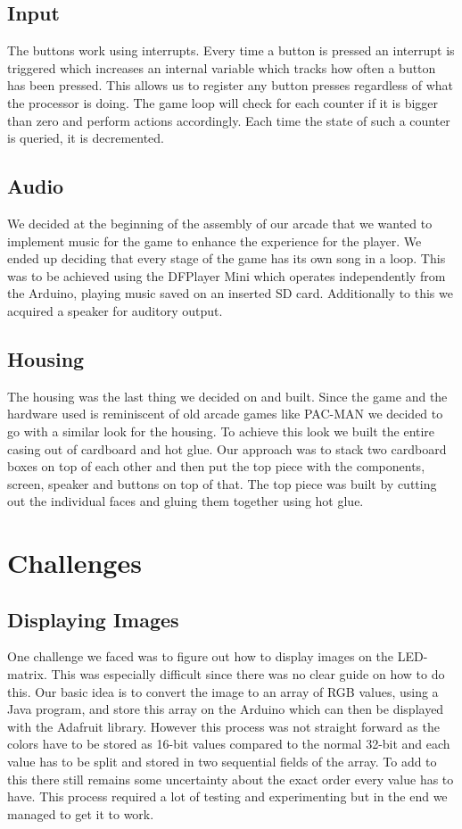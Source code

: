 \documentclass[10pt, a4paper]{article}
\begin{document}
\subsection*{Input}
The buttons work using interrupts. Every time a button is pressed an interrupt is triggered which increases an internal variable which tracks how often a button has been pressed. This allows us to register any button presses regardless of what the processor is doing. The game loop will check for each counter if it is bigger than zero and perform actions accordingly. Each time the state of such a counter is queried, it is decremented.

\subsection*{Audio}
We decided at the beginning of the assembly of our arcade that we wanted to implement music for the game to enhance the experience for the player. We ended up deciding that every stage of the game has its own song in a loop. This was to be achieved using the DFPlayer Mini which operates independently from the Arduino, playing music saved on an inserted SD card. Additionally to this we acquired a speaker for auditory output.

\subsection*{Housing}
The housing was the last thing we decided on and built. Since the game and the hardware used is reminiscent of old arcade games like PAC-MAN we decided to go with a similar look for the housing. To achieve this look we built the entire casing out of cardboard and hot glue. Our approach was to stack two cardboard boxes on top of each other and then put the top piece with the components, screen, speaker and buttons on top of that. The top piece was built by cutting out the individual faces and gluing them together using hot glue.


\section*{Challenges}
\label{sec:challenges}

\subsection*{Displaying Images}
One challenge we faced was to figure out how to display images on the LED-matrix. This was especially difficult since there was no clear guide on how to do this. Our basic idea is to convert the image to an array of RGB values, using a Java program, and store this array on the Arduino which can then be displayed with the Adafruit library. However this process was not straight forward as the colors have to be stored as 16-bit values compared to the normal 32-bit and each value has to be split and stored in two sequential fields of the array. To add to this there still remains some uncertainty about the exact order every value has to have. This process required a lot of testing and experimenting but in the end we managed to get it to work. 
\end{document}
